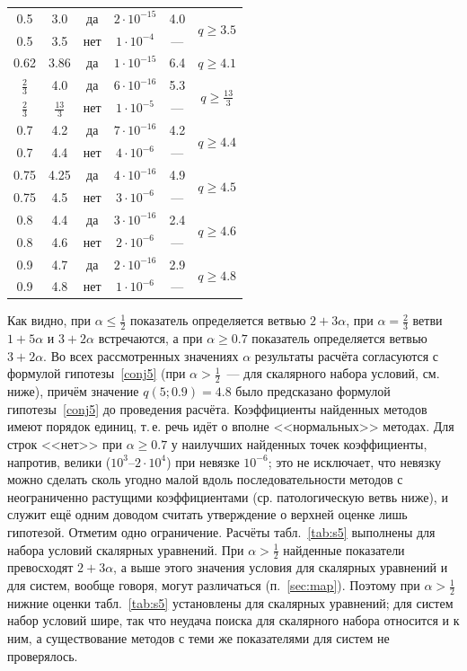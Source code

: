 \documentclass[11pt,a4paper]{article}
\theoremstyle{plain}
\theoremstyle{definition}
\begin{document}
\begin{table}[ht]
\begin{tabular}{cccccc}
0.5 & 3.0 & да & $2\cdot10^{-15}$ & 4.0 & \multirow{2}{*}{$q\ge3.5$}\\
0.5 & 3.5 & нет & $1\cdot10^{-4}$ & --- & \\
0.62 & 3.86 & да & $1\cdot10^{-15}$ & 6.4 & $q\ge4.1$\\
$\frac23$ & 4.0 & да & $6\cdot10^{-16}$ & 5.3 & \multirow{2}{*}{$q\ge\frac{13}{3}$}\\
$\frac23$ & $\frac{13}{3}$ & нет & $1\cdot10^{-5}$ & --- & \\
0.7 & 4.2 & да & $7\cdot10^{-16}$ & 4.2 & \multirow{2}{*}{$q\ge4.4$}\\
0.7 & 4.4 & нет & $4\cdot10^{-6}$ & --- & \\
0.75 & 4.25 & да & $4\cdot10^{-16}$ & 4.9 & \multirow{2}{*}{$q\ge4.5$}\\
0.75 & 4.5 & нет & $3\cdot10^{-6}$ & --- & \\
0.8 & 4.4 & да & $3\cdot10^{-16}$ & 2.4 & \multirow{2}{*}{$q\ge4.6$}\\
0.8 & 4.6 & нет & $2\cdot10^{-6}$ & --- & \\
0.9 & 4.7 & да & $2\cdot10^{-16}$ & 2.9 & \multirow{2}{*}{$q\ge4.8$}\\
0.9 & 4.8 & нет & $1\cdot10^{-6}$ & --- & \\
\bottomrule
\end{tabular}
\end{table}

Как видно, при $\alpha\le\frac12$ показатель определяется ветвью $2+3\alpha$, при $\alpha=\frac23$ ветви $1+5\alpha$ и $3+2\alpha$ встречаются, а при $\alpha\ge0.7$ показатель определяется ветвью $3+2\alpha$. Во всех рассмотренных значениях $\alpha$ результаты расчёта согласуются с формулой гипотезы~\ref{conj5} (при $\alpha>\frac12$~--- для скалярного набора условий, см. ниже), причём значение $q(5;0.9)=4.8$ было предсказано формулой гипотезы~\ref{conj5} до проведения расчёта. Коэффициенты найденных методов имеют порядок единиц, т.\,е. речь идёт о вполне <<нормальных>> методах. Для строк <<нет>> при $\alpha\ge0.7$ у наилучших найденных точек коэффициенты, напротив, велики ($10^3$--$2\cdot10^4$) при невязке $10^{-6}$; это не исключает, что невязку можно сделать сколь угодно малой вдоль последовательности методов с неограниченно растущими коэффициентами (ср. патологическую ветвь ниже), и служит ещё одним доводом считать утверждение о верхней оценке лишь гипотезой. Отметим одно ограничение. Расчёты табл.~\ref{tab:s5} выполнены для набора условий скалярных уравнений. При $\alpha>\frac12$ найденные показатели превосходят $2+3\alpha$, а выше этого значения условия для скалярных уравнений и для систем, вообще говоря, могут различаться (п.~\ref{sec:map}). Поэтому при $\alpha>\frac12$ нижние оценки табл.~\ref{tab:s5} установлены для скалярных уравнений; для систем набор условий шире, так что неудача поиска для скалярного набора относится и к ним, а существование методов с теми же показателями для систем не проверялось.
\end{document}
